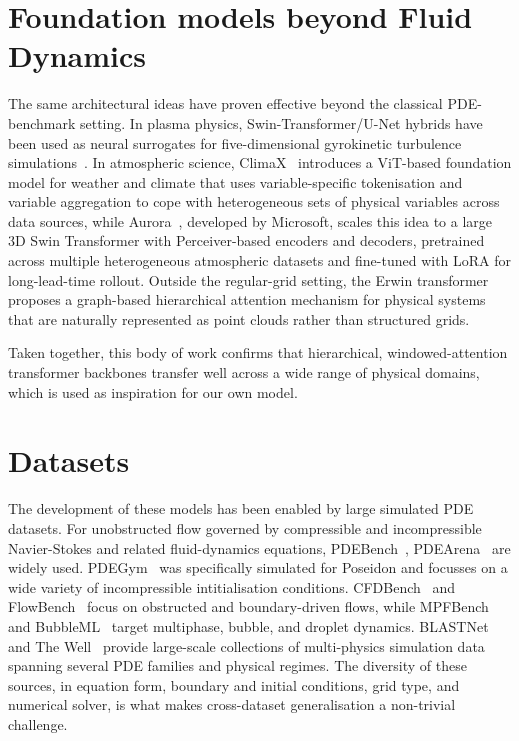 \section{Foundation models beyond Fluid Dynamics} 

The same architectural ideas have proven effective beyond the classical PDE-benchmark setting. In plasma physics, Swin-Transformer/U-Net hybrids have been used as neural surrogates for five-dimensional gyrokinetic turbulence simulations~\cite{gyrokinetic2024}. In atmospheric science, ClimaX~\cite{nguyen2023climax} introduces a ViT-based foundation model for weather and climate that uses variable-specific tokenisation and variable aggregation to cope with heterogeneous sets of physical variables across data sources, while Aurora~\cite{bodnar2024aurora}, developed by Microsoft, scales this idea to a large 3D Swin Transformer with Perceiver-based encoders and decoders, pretrained across multiple heterogeneous atmospheric datasets and fine-tuned with LoRA for long-lead-time rollout. Outside the regular-grid setting, the Erwin transformer~\cite{erwin2025} proposes a graph-based hierarchical attention mechanism for physical systems that are naturally represented as point clouds rather than structured grids. 

Taken together, this body of work confirms that hierarchical, windowed-attention transformer backbones transfer well across a wide range of physical domains, which is used as inspiration for our own model.

\section{Datasets} 

The development of these models has been enabled by large simulated PDE datasets. For unobstructed flow governed by compressible and incompressible Navier-Stokes and related fluid-dynamics equations, PDEBench~\cite{takamoto2022pdebench}, PDEArena~\cite{gupta2022pdearena} are widely used. PDEGym~\cite{herde2024poseidon} was specifically simulated for Poseidon and focusses on a wide variety of incompressible intitialisation conditions. CFDBench~\cite{luo2023cfdbench} and FlowBench~\cite{tali2024flowbench} focus on obstructed and boundary-driven flows, while MPFBench and BubbleML~\cite{hassan2023bubbleml} target multiphase, bubble, and droplet dynamics. BLASTNet~\cite{chung2023blastnet} and The Well~\cite{ohana2024thewell} provide large-scale collections of multi-physics simulation data spanning several PDE families and physical regimes. The diversity of these sources, in equation form, boundary and initial conditions, grid type, and numerical solver, is what makes cross-dataset generalisation a non-trivial challenge. 


